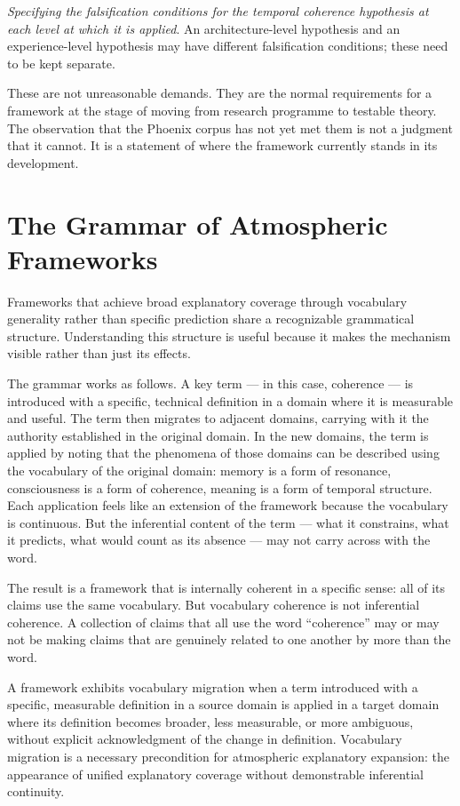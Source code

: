 \textit{Specifying the falsification conditions for the
temporal coherence hypothesis at each level at which it
is applied}. An architecture-level hypothesis and an
experience-level hypothesis may have different falsification
conditions; these need to be kept separate.

These are not unreasonable demands. They are the normal
requirements for a framework at the stage of moving from
research programme to testable theory. The observation
that the Phoenix corpus has not yet met them is not a
judgment that it cannot. It is a statement of where the
framework currently stands in its development.

\section{The Grammar of Atmospheric Frameworks}
\label{sec:atmospheric-grammar}

Frameworks that achieve broad explanatory coverage through
vocabulary generality rather than specific prediction share
a recognizable grammatical structure. Understanding this
structure is useful because it makes the mechanism visible
rather than just its effects.

The grammar works as follows. A key term --- in this case,
coherence --- is introduced with a specific, technical
definition in a domain where it is measurable and useful.
The term then migrates to adjacent domains, carrying with
it the authority established in the original domain.
In the new domains, the term is applied by noting that
the phenomena of those domains can be described using
the vocabulary of the original domain: memory is a form
of resonance, consciousness is a form of coherence,
meaning is a form of temporal structure. Each application
feels like an extension of the framework because the
vocabulary is continuous. But the inferential content of
the term --- what it constrains, what it predicts, what
would count as its absence --- may not carry across with
the word.

The result is a framework that is internally coherent in
a specific sense: all of its claims use the same vocabulary.
But vocabulary coherence is not inferential coherence.
A collection of claims that all use the word ``coherence''
may or may not be making claims that are genuinely related
to one another by more than the word.

\begin{auditprop}
\label{ap:vocabulary-migration}
A framework exhibits vocabulary migration when a term
introduced with a specific, measurable definition in a
source domain is applied in a target domain where its
definition becomes broader, less measurable, or more
ambiguous, without explicit acknowledgment of the change
in definition. Vocabulary migration is a necessary
precondition for atmospheric explanatory expansion: the
appearance of unified explanatory coverage without
demonstrable inferential continuity.
\end{auditprop}

